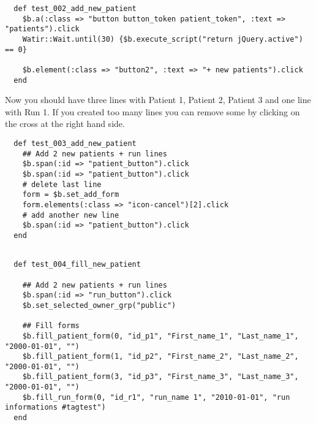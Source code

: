 \begin{verbatim}
  def test_002_add_new_patient
    $b.a(:class => "button button_token patient_token", :text => "patients").click
    Watir::Wait.until(30) {$b.execute_script("return jQuery.active") == 0}

    $b.element(:class => "button2", :text => "+ new patients").click
  end

\end{verbatim}

  Now you should have three lines with Patient 1, Patient 2, Patient 3 and one
  line with Run 1.
  If you created too many lines you can remove some by clicking on the cross at
  the right hand side.

\begin{verbatim}
  def test_003_add_new_patient
    ## Add 2 new patients + run lines
    $b.span(:id => "patient_button").click
    $b.span(:id => "patient_button").click
    # delete last line
    form = $b.set_add_form
    form.elements(:class => "icon-cancel")[2].click
    # add another new line
    $b.span(:id => "patient_button").click
  end

\end{verbatim}

\begin{verbatim}
 
  def test_004_fill_new_patient

    ## Add 2 new patients + run lines
    $b.span(:id => "run_button").click
    $b.set_selected_owner_grp("public")

    ## Fill forms
    $b.fill_patient_form(0, "id_p1", "First_name_1", "Last_name_1", "2000-01-01", "")
    $b.fill_patient_form(1, "id_p2", "First_name_2", "Last_name_2", "2000-01-01", "")
    $b.fill_patient_form(3, "id_p3", "First_name_3", "Last_name_3", "2000-01-01", "")
    $b.fill_run_form(0, "id_r1", "run_name 1", "2010-01-01", "run informations #tagtest")
  end

\end{verbatim}

